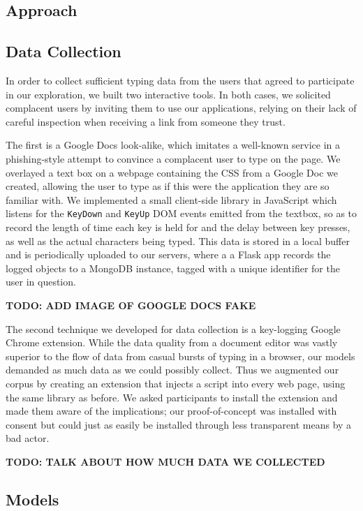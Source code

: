 \documentclass{amsart}
\begin{document}
\begin{multicols*}{2}
\section{Approach}
\subsection{Data Collection}

In order to collect sufficient typing data from the users that agreed to participate in our exploration, we built two interactive tools. In both cases, we solicited complacent users by inviting them to use our applications, relying on their lack of careful inspection when receiving a link from someone they trust.

The first is a Google Docs look-alike, which imitates a well-known service in a phishing-style attempt to convince a complacent user to type on the page. We overlayed a text box on a webpage containing the CSS from a Google Doc we created, allowing the user to type as if this were the application they are so familiar with. We implemented a small client-side library in JavaScript which listens for the \texttt{KeyDown} and \texttt{KeyUp} DOM events emitted from the textbox, so as to record the length of time each key is held for and the delay between key presses, as well as the actual characters being typed. This data is stored in a local buffer and is periodically uploaded to our servers, where a a Flask app records the logged objects to a MongoDB instance, tagged with a unique identifier for the user in question.

\textbf{TODO: ADD IMAGE OF GOOGLE DOCS FAKE}

The second technique we developed for data collection is a key-logging Google Chrome extension. While the data quality from a document editor was vastly superior to the flow of data from casual bursts of typing in a browser, our models demanded as much data as we could possibly collect. Thus we augmented our corpus by creating an extension that injects a script into every web page, using the same library as before. We asked participants to install the extension and made them aware of the implications; our proof-of-concept was installed with consent but could just as easily be installed through less transparent means by a bad actor.

\textbf{TODO: TALK ABOUT HOW MUCH DATA WE COLLECTED}

\subsection{Models}

\end{multicols*}
\end{document}
